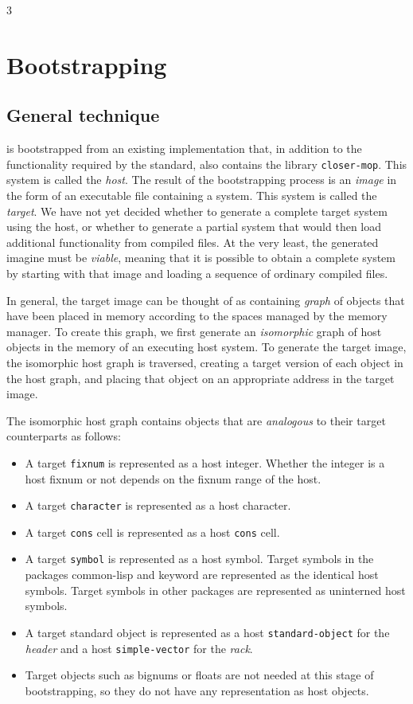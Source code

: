 3\chapter{Bootstrapping}

\section{General technique}

\sysname{} is bootstrapped from an existing \commonlisp{}
implementation that, in addition to the functionality required by the
standard, also contains the library \texttt{closer-mop}.  This
\commonlisp{} system is called the \emph{host}.  The result of the
bootstrapping process is an \emph{image} in the form of an executable
file containing a \sysname{} system.  This system is called the
\emph{target}.  We have not yet decided whether to generate a complete
target system using the host, or whether to generate a partial system
that would then load additional functionality from compiled files.  At
the very least, the generated imagine must be \emph{viable}, meaning
that it is possible to obtain a complete \commonlisp{} system by
starting with that image and loading a sequence of ordinary compiled
files.

In general, the target image can be thought of as containing
\emph{graph} of \commonlisp{} objects that have been placed in memory
according to the spaces managed by the memory manager.  To create this
graph, we first generate an \emph{isomorphic} graph of host objects in
the memory of an executing host system.  To generate the target image,
the isomorphic host graph is traversed, creating a target version of
each object in the host graph, and placing that object on an
appropriate address in the target image.

The isomorphic host graph contains objects that are \emph{analogous}
to their target counterparts as follows:

\begin{itemize}
\item A target \texttt{fixnum} is represented as a host integer.
  Whether the integer is a host fixnum or not depends on the fixnum
  range of the host.
\item A target \texttt{character} is represented as a host character.
\item A target \texttt{cons} cell is represented as a host
  \texttt{cons} cell.
\item A target \texttt{symbol} is represented as a host symbol.
  Target symbols in the packages {\sc common-lisp} and {\sc keyword}
  are represented as the identical host symbols.  Target symbols in
  other packages are represented as uninterned host symbols.
\item A target standard object is represented as a host
  \texttt{standard-object} for the \emph{header} and a host
  \texttt{simple-vector} for the \emph{rack}.
\item Target objects such as bignums or floats are not needed at this
  stage of bootstrapping, so they do not have any representation as
  host objects.
\end{itemize}

